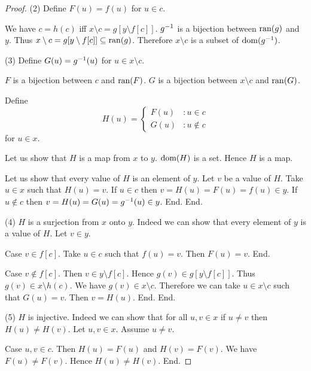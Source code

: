 \documentclass{article}
\begin{document}
\begin{forthel}
\begin{proof}
        (2) Define $F(u) = f(u)$ for $u \in c$.

        We have $c = h(c)$ iff $x \setminus c = g[y \setminus f[c]]$.
        $g^{-1}$ is a bijection between $\operatorname{ran}(g)$ and $y$.
        Thus $x \setminus c = g[y \setminus f[c]] \subseteq \operatorname{ran}(g)$.
        Therefore $x \setminus c$ is a subset of $\operatorname{dom}(g^{-1})$.

        (3) Define $G(u) = g^{-1}(u)$ for $u \in x \setminus c$.

        $F$ is a bijection between $c$ and $\operatorname{ran}(F)$.
        $G$ is a bijection between $x \setminus c$ and $\operatorname{ran}(G)$.

        Define \[ H(u) =
          \begin{cases}
            F(u) & : u \in c \\
            G(u) & : u \notin c
          \end{cases} \]
        for $u \in x$.

        Let us show that $H$ is a map from $x$ to $y$.
          $\operatorname{dom}(H)$ is a set.
          Hence $H$ is a map.

          Let us show that every value of $H$ is an element of $y$.
            Let $v$ be a value of $H$.
            Take $u \in x$ such that $H(u) = v$.
            If $u \in c$ then $v = H(u) = F(u) = f(u) \in y$.
            If $u \notin c$ then $v = H(u) = G(u) = g^{-1}(u) \in y$.
          End.
        End.

        (4) $H$ is a surjection from $x$  onto $y$.
        Indeed we can show that every element of $y$ is a value of $H$.
          Let $v \in y$.

          Case $v \in f[c]$.
            Take $u \in c$ such that $f(u) = v$.
            Then $F(u) = v$.
          End.

          Case $v \notin f[c]$.
            Then $v \in y \setminus f[c]$.
            Hence $g(v) \in g[y \setminus f[c]]$.
            Thus $g(v) \in x \setminus h(c)$.
            We have $g(v) \in x \setminus c$.
            Therefore we can take $u \in x \setminus c$ such that $G(u) = v$.
            Then $v = H(u)$.
          End.
        End.

        (5) $H$ is injective.
        Indeed we can show that for all $u, v \in x$ if $u \neq v$ then
        $H(u) \neq H(v)$.
          Let $u,v \in x$.
          Assume $u \neq v$.

          Case $u,v \in c$.
            Then $H(u) = F(u)$ and $H(v) = F(v)$.
            We have $F(u) \neq F(v)$.
            Hence $H(u) \neq H(v)$.
          End.


\end{proof}
\end{forthel}
\end{document}
